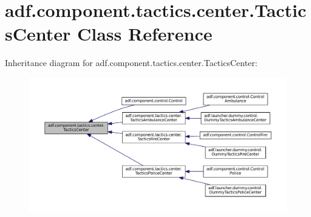 \hypertarget{classadf_1_1component_1_1tactics_1_1center_1_1TacticsCenter}{}\section{adf.\+component.\+tactics.\+center.\+Tactics\+Center Class Reference}
\label{classadf_1_1component_1_1tactics_1_1center_1_1TacticsCenter}


Inheritance diagram for adf.\+component.\+tactics.\+center.\+Tactics\+Center\+:
\nopagebreak
\begin{figure}[H]
\begin{center}
\leavevmode
\includegraphics[width=350pt]{classadf_1_1component_1_1tactics_1_1center_1_1TacticsCenter__inherit__graph}
\end{center}
\end{figure}
